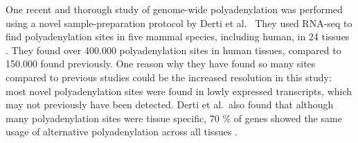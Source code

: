 One recent and thorough study of genome-wide polyadenylation was performed
using a novel sample-preparation protocol by Derti et al.\
\cite{derti_quantitative_2012} They used RNA-seq to find polyadenylation sites
in five mammal species, including human, in 24 tissues
\cite{derti_quantitative_2012}.  They found over 400.000 polyadenylation sites
in human tissues, compared to 150.000 found previously. One reason why they
have found so many sites compared to previous studies could be the increased
resolution in this study: most novel polyadenylation sites were found in lowly
expressed transcripts, which may not previously have been detected. Derti et
al.\ also found that although many polyadenylation sites were tissue specific,
70 \% of genes showed the same usage of alternative polyadenylation across all
tissues \cite{derti_quantitative_2012}.
